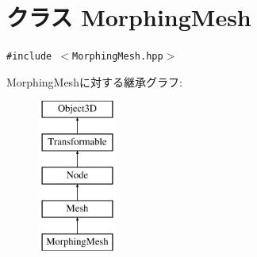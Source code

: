 \hypertarget{classm3g_1_1MorphingMesh}{
\section{クラス MorphingMesh}
\label{classm3g_1_1MorphingMesh}
}
{\tt \#include $<$MorphingMesh.hpp$>$}

MorphingMeshに対する継承グラフ:\begin{figure}[H]
\begin{center}
\leavevmode
\includegraphics[height=5cm]{classm3g_1_1MorphingMesh}
\end{center}
\end{figure}
